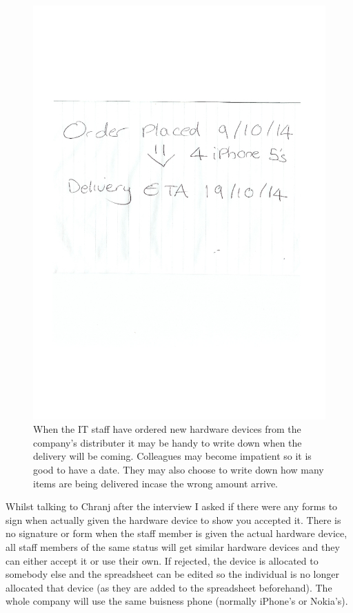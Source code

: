 \begin{figure}[H]
\includegraphics[width=.9\textwidth,height=.9\textheight,keepaspectratio]{OrdersPlaced.jpg}
\caption{When the IT staff have ordered new hardware devices from the company's distributer it may be handy to write down when the delivery will be coming. Colleagues may become impatient so it is good to have a date. They may also choose to write down how many items are being delivered incase the wrong amount arrive.} \label{OrdersPlaced}
\end{figure}

Whilst talking to Chranj after the interview I asked if there were any forms to sign when actually given the hardware device to show you accepted it. There is no signature or form when the staff member is given the actual hardware device, all staff members of the same status will get similar hardware devices and they can either accept it or use their own. If rejected, the device is allocated to somebody else and the spreadsheet can be edited so the individual is no longer allocated that device (as they are added to the spreadsheet beforehand). The whole company will use the same buisness phone (normally iPhone's or Nokia's). 

